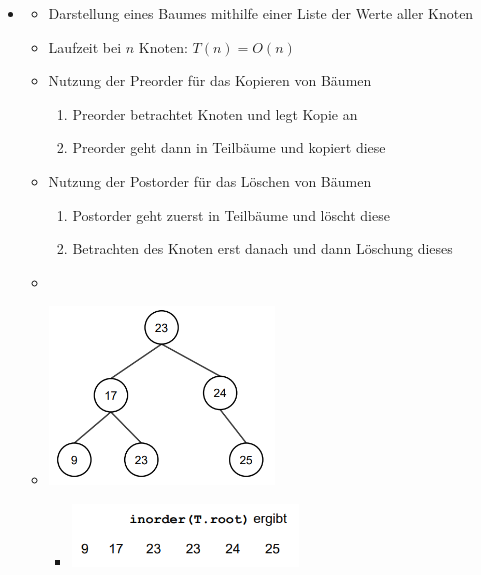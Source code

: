 \documentclass[
    12pt,
    a4paper,
    ngerman,
    color=3b,%
    marginpar=false,
    colorback=false,
    leqno,
]{tudaexercise}
\begin{document}
\begin{itemize}
    \item {}
          \begin{itemize}
              \item Darstellung eines Baumes mithilfe einer Liste der Werte aller Knoten
              \item Laufzeit bei $n$ Knoten: $T(n) = O(n)$
              \item Nutzung der Preorder für das Kopieren von Bäumen
                    \begin{enumerate}
                        \item Preorder betrachtet Knoten und legt Kopie an
                        \item Preorder geht dann in Teilbäume und kopiert diese
                    \end{enumerate}
              \item Nutzung der Postorder für das Löschen von Bäumen
                    \begin{enumerate}
                        \item Postorder geht zuerst in Teilbäume und löscht diese
                        \item Betrachten des Knoten erst danach und dann Löschung dieses
                    \end{enumerate}
              \item[]
              \item[]
                    \begin{minipage}[t]{0.4\textwidth}
                        \includegraphics[width=6cm]{pictures/inorder1}
                    \end{minipage}
                    \begin{minipage}[t]{0.5\textwidth}
                        \vspace{-4.75cm}
                        \begin{itemize}
                            \item[] \includegraphics[width=6cm]{pictures/inorder2}

\end{itemize}
\end{minipage}
\end{itemize}
\end{itemize}
\end{document}

